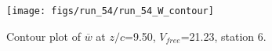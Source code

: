 \begin{figure}[H]
\centering
\texttt{[image: figs/run\_54/run\_54\_W\_contour]}
\caption{Contour plot of $\overline{w}$ at $z/c$=9.50, $V_{free}$=21.23, station 6.}
\label{fig:run_54_W_contour}
\end{figure}


